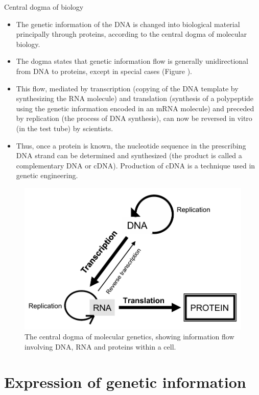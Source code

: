 \documentclass[11pt,ignorenonframetext,aspectratio=169]{beamer}
\providecommand{\tightlist}{%
  \setlength{\itemsep}{0pt}\setlength{\parskip}{0pt}}
\begin{document}
\begin{frame}{Central dogma of biology}
\protect\hypertarget{central-dogma-of-biology}{}

\begin{itemize}
\tightlist
\item
  The genetic information of the DNA is changed into biological material
  principally through proteins, according to the central dogma of
  molecular biology.
\item
  The dogma states that genetic information flow is generally
  unidirectional from DNA to proteins, except in special cases (Figure
  ).
\item
  This flow, mediated by transcription (copying of the DNA template by
  synthesizing the RNA molecule) and translation (synthesis of a
  polypeptide using the genetic information encoded in an mRNA molecule)
  and preceded by replication (the process of DNA synthesis), can now be
  reversed in vitro (in the test tube) by scientists.
\item
  Thus, once a protein is known, the nucleotide sequence in the
  prescribing DNA strand can be determined and synthesized (the product
  is called a complementary DNA or cDNA). Production of cDNA is a
  technique used in genetic engineering.
\end{itemize}

\end{frame}

\begin{frame}{}
\protect\hypertarget{section-11}{}

\begin{figure}
\includegraphics[width=0.45\linewidth]{../images/central_dogma_biology} \caption{The central dogma of molecular genetics, showing information flow involving DNA, RNA and proteins within a cell.}\label{fig:central-dogma-biology}
\end{figure}

\end{frame}

\hypertarget{expression-of-genetic-information}{%
\section{Expression of genetic
information}\label{expression-of-genetic-information}}
\end{document}
